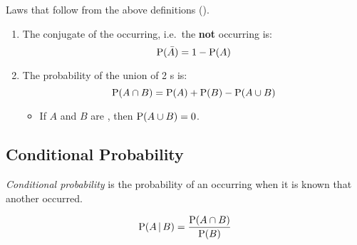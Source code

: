 Laws that follow from the above definitions ().
\begin{enumerate}[noitemsep]
\item The conjugate of the  occurring, i.e.\ the  \textbf{not} occurring is:
  \begin{equation}\label{eq:Conjugate_Event}
    \operatorname{\operatorname{P}}(\bar{A}) = 1 - \operatorname{\operatorname{P}}(A)
  \end{equation}

\item The probability of the union of 2 s is:
  \begin{equation}\label{eq:Union_Probability}
    \operatorname{\operatorname{P}}(A \cap B) = \operatorname{\operatorname{P}}(A) + \operatorname{\operatorname{P}}(B) - \operatorname{\operatorname{P}}(A \cup B)
  \end{equation}
  \begin{itemize}[noitemsep]
  \item If $A$ and $B$ are , then $\operatorname{\operatorname{P}}(A \cup B) = 0$.
  \end{itemize}
\end{enumerate}

\subsection{Conditional Probability}\label{subsec:Conditional_Probability}
\begin{definition}\label{def:Conditional_Probability}
  \emph{Conditional probability} is the probability of an  occurring when it is known that another  occurred.

  \begin{equation}\label{eq:Conditional_Probability}
    \operatorname{\operatorname{P}}(A \operatorname{\vert} B) = \frac{\operatorname{\operatorname{P}}(A \cap B)}{\operatorname{\operatorname{P}}(B)}
  \end{equation}
\end{definition}

